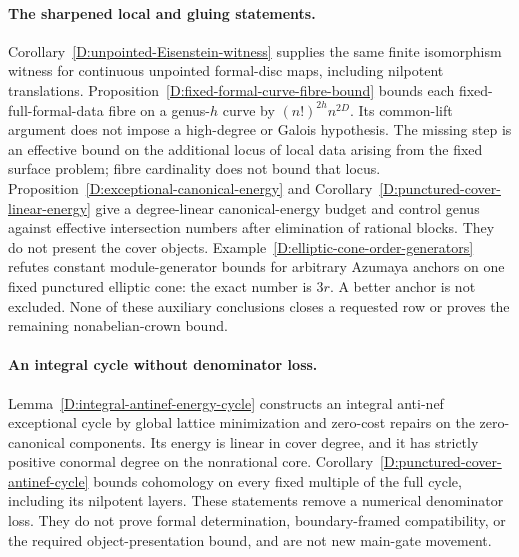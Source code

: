 \paragraph{The sharpened local and gluing statements.}
Corollary~\ref{D:unpointed-Eisenstein-witness} supplies the same finite
isomorphism witness for continuous unpointed formal-disc maps, including
nilpotent translations. Proposition~\ref{D:fixed-formal-curve-fibre-bound}
bounds each fixed-full-formal-data fibre on a genus-$h$ curve by
$(n!)^{2h}n^{2D}$. Its common-lift argument does not impose a high-degree
or Galois hypothesis. The missing step is an effective bound on the
additional locus of local data arising from the fixed surface problem;
fibre cardinality does not bound that locus.
Proposition~\ref{D:exceptional-canonical-energy} and
Corollary~\ref{D:punctured-cover-linear-energy} give a degree-linear
canonical-energy budget and control genus against effective intersection
numbers after elimination of rational blocks. They do not present the
cover objects. Example~\ref{D:elliptic-cone-order-generators} refutes
constant module-generator bounds for arbitrary Azumaya anchors on one
fixed punctured elliptic cone: the exact number is $3r$. A better anchor
is not excluded. None of these auxiliary conclusions closes a requested
row or proves the remaining nonabelian-crown bound.


\paragraph{An integral cycle without denominator loss.}
Lemma~\ref{D:integral-antinef-energy-cycle} constructs an integral
anti-nef exceptional cycle by global lattice minimization and zero-cost
repairs on the zero-canonical components. Its energy is linear in cover
degree, and it has strictly positive conormal degree on the nonrational
core. Corollary~\ref{D:punctured-cover-antinef-cycle} bounds cohomology on
every fixed multiple of the full cycle, including its nilpotent layers.
These statements remove a numerical denominator loss. They do not prove
formal determination, boundary-framed compatibility, or the required
object-presentation bound, and are not new main-gate movement.


